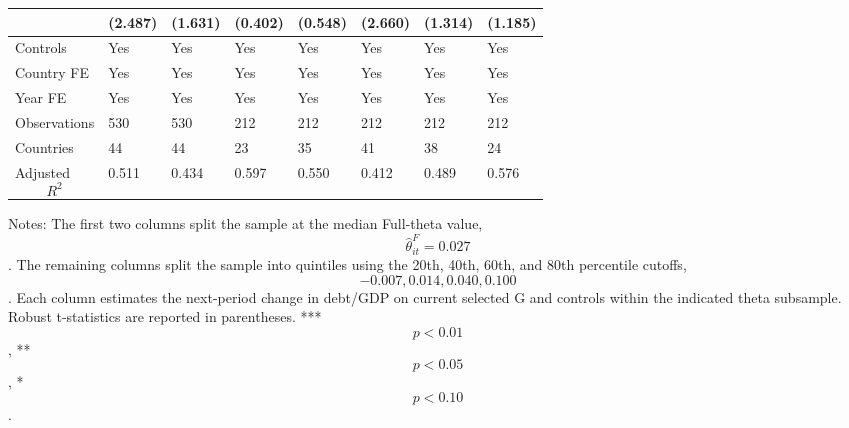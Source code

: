\begin{table}[H]
\begin{threeparttable}
\begin{tabularx}{\textwidth}{lYYYYYYY}
  & (2.487) & (1.631) & (0.402) & (0.548) & (2.660) & (1.314) & (1.185) \\
\midrule
Controls & Yes & Yes & Yes & Yes & Yes & Yes & Yes \\
Country FE & Yes & Yes & Yes & Yes & Yes & Yes & Yes \\
Year FE & Yes & Yes & Yes & Yes & Yes & Yes & Yes \\
Observations & 530 & 530 & 212 & 212 & 212 & 212 & 212 \\
Countries & 44 & 44 & 23 & 35 & 41 & 38 & 24 \\
Adjusted $$R^2$$ & 0.511 & 0.434 & 0.597 & 0.550 & 0.412 & 0.489 & 0.576 \\
\bottomrule
\end{tabularx}
\begin{tablenotes}[flushleft]\footnotesize
\item Notes: The first two columns split the sample at the median Full-theta value, $$\widehat{\theta}^{F}_{it}=0.027$$. The remaining columns split the sample into quintiles using the 20th, 40th, 60th, and 80th percentile cutoffs, $$-0.007, 0.014, 0.040, 0.100$$. Each column estimates the next-period change in debt/GDP on current selected G and controls within the indicated theta subsample. Robust t-statistics are reported in parentheses. *** $$p<0.01$$, ** $$p<0.05$$, * $$p<0.10$$.
\end{tablenotes}
\end{threeparttable}
\end{table}
